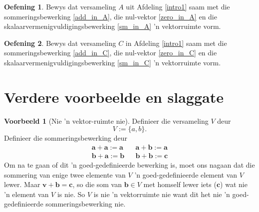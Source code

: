 \documentclass[a4paper,11pt]{book}
\theoremstyle{definition}
\newtheorem{exercise}{Oefening}
\newtheorem{example_environment}{Voorbeeld}[chapter]
\newcommand{\be}{\begin{equation}}
\newcommand{\ee}{\end{equation}}
\newcommand{\ve}[1]{\mathbf{#1}}
\newenvironment{example}
	{
		\begin{oframed}
		\begin{example_environment}
	}
	{
		\end{example_environment}
		\end{oframed}
	}
\begin{document}
\begin{exercise} Bewys dat versameling $A$ uit Afdeling \ref{intro1} saam
	met die sommeringsbewerking \eqref{add_in_A}, die nul-vektor
	\eqref{zero_in_A} en die skalaarvermenigvuldigingsbewerking
	\eqref{sm_in_A} 'n vektorruimte vorm.
\end{exercise}

\begin{exercise} Bewys dat versameling $C$ in Afdeling \ref{intro1} saam
	met die sommeringsbewerking \eqref{add_in_C}, die nul-vektor
	\eqref{zero_in_C} en die skalaarvermenigvuldigingsbewerking
	\eqref{sm_in_C} 'n vektorruimte vorm.
\end{exercise}


\section{Verdere voorbeelde en slaggate}

\begin{example}[Nie 'n vektor-ruimte nie] Definieer die versameling $V$
	deur
	\be
	V := \{ a, b \} .
	\ee
	Definieer die sommeringsbewerking deur
	\begin{align}
		\ve{a} + \ve{a} := \ve{a} && \ve{a} + \ve{b} := \ve{a} \\
		\ve{b} + \ve{a} := \ve{b} && \ve{b} + \ve{b} := \ve{c}
	\end{align}
	Om na te gaan of dit 'n goed-gedefinieerde bewerking is, moet ons
	nagaan dat die sommering van enige twee elemente van $V$ 'n
	goed-gedefinieerde element van $V$ lewer. Maar $\ve{v} + \ve{b} =
	\ve{c}$, so die som van $\ve{b} \in V$ met homself lewer iets
	($\ve{c}$) wat nie 'n element van $V$ is nie. So $V$ is nie 'n
	vektorruimte nie want dit het nie 'n goed-gedefinieerde
	sommeringsbewerking nie.
\end{example}
\end{document}
